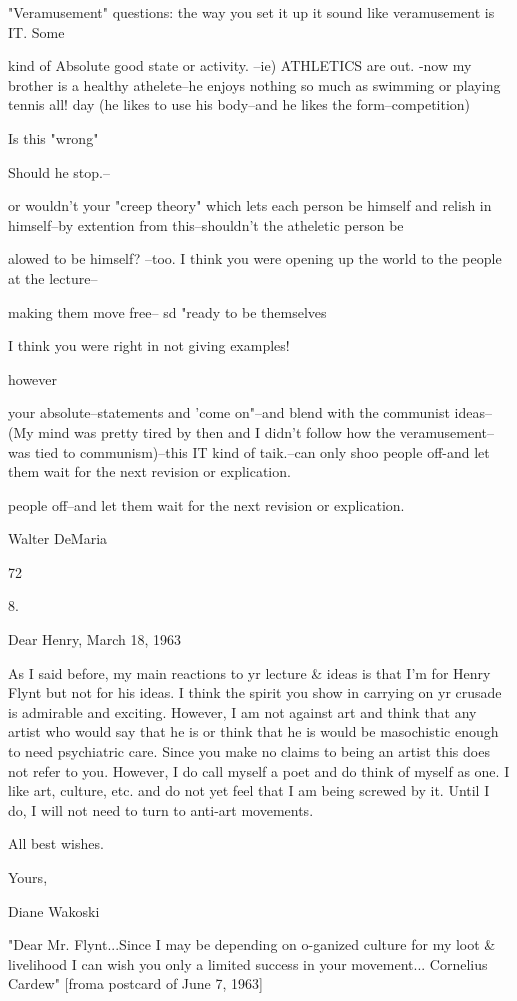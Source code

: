 \documentclass[10pt,twoside]{memoir}
\begin{document}
\begin{enumerate}
{{{{{{{{{{{{{{{"Veramusement" 
questions: the way you set it up it sound like veramusement is IT. Some 


kind of Absolute good state or activity. --ie) ATHLETICS are out. 
-now my brother is a healthy athelete--he enjoys nothing so much as 
swimming or playing tennis all! day (he likes to use his body--and he likes the 
form--competition) 

Is this "wrong" 

Should he stop.-- 


or wouldn't your "creep theory" which lets each person be himself and 
relish in himself--by extention from this--shouldn't the atheletic person be 


alowed to be himself? --too. 
I think you were opening up the world to the people at the lecture-- 


making them move free-- 
sd "ready to be themselves 


I think you were right in not giving examples! 


however 

your absolute--statements and 'come on"--and blend with the communist 
ideas--(My mind was pretty tired by then and I didn't follow how the 
veramusement--was tied to communism)--this IT kind of taik.--can only shoo 
people off-and let them wait for the next revision or explication. 

people off--and let them wait for the next revision or explication. 


Walter DeMaria 


72 


8. 


Dear Henry, March 18, 1963 


As I said before, my main reactions to yr lecture & ideas is that I'm for 
Henry Flynt but not for his ideas. I think the spirit you show in carrying on 
yr crusade is admirable and exciting. However, I am not against art and think 
that any artist who would say that he is or think that he is would be 
masochistic enough to need psychiatric care. Since you make no claims to 
being an artist this does not refer to you. However, I do call myself a poet 
and do think of myself as one. I like art, culture, etc. and do not yet feel 
that I am being screwed by it. Until I do, I will not need to turn to anti-art 
movements. 

All best wishes. 

Yours, 

Diane Wakoski 


"Dear Mr. Flynt...Since I may be depending on o-ganized culture for my 
loot & livelihood I can wish you only a limited success in your movement... 
Cornelius Cardew" [froma postcard of June 7, 1963] 


}}}}}}}}}}}}}}}
\end{enumerate}
\end{document}
